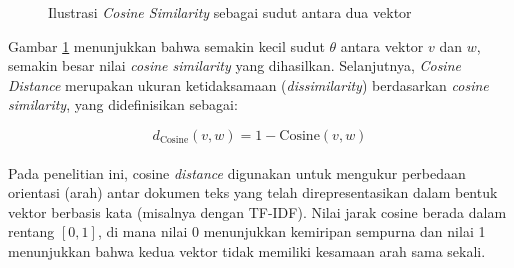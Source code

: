 \documentclass[a4paper,12pt]{report}
\numberwithin{equation}{chapter}
\begin{document}
\begin{figure}[h]
\centering
{}
\caption{Ilustrasi \textit{Cosine Similarity} sebagai sudut antara dua vektor}
\label{fig:cosine}
\end{figure}


Gambar \ref{fig:cosine} menunjukkan bahwa semakin kecil sudut $\theta$ antara vektor $v$ dan $w$, semakin besar nilai \textit{cosine similarity} yang dihasilkan. Selanjutnya, \textit{Cosine Distance} merupakan ukuran ketidaksamaan (\textit{dissimilarity}) berdasarkan \textit{cosine similarity}, yang didefinisikan sebagai:

\begin{equation}
    d_{\text{Cosine}}(v, w) = 1 - \text{Cosine}(v, w)
    \label{eq:jarakcosine}
\end{equation}
\\
Pada penelitian ini, cosine \textit{distance} digunakan untuk mengukur perbedaan orientasi (arah) antar dokumen teks yang telah direpresentasikan dalam bentuk vektor berbasis kata (misalnya dengan TF-IDF). Nilai jarak cosine berada dalam rentang $[0,1]$, di mana nilai 0 menunjukkan kemiripan sempurna dan nilai 1 menunjukkan bahwa kedua vektor tidak memiliki kesamaan arah sama sekali.
\end{document}
